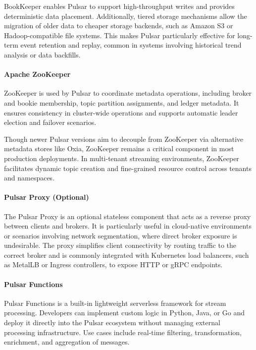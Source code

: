 BookKeeper enables Pulsar to support high-throughput writes and provides deterministic data placement. Additionally, tiered storage mechanisms allow the migration of older data to cheaper storage backends, such as Amazon S3 or Hadoop-compatible file systems. This makes Pulsar particularly effective for long-term event retention and replay, common in systems involving historical trend analysis or data backfills.

\paragraph{Apache ZooKeeper}
ZooKeeper \cite{zookeeper-docs} is used by Pulsar to coordinate metadata operations, including broker and bookie membership, topic partition assignments, and ledger metadata. It ensures consistency in cluster-wide operations and supports automatic leader election and failover scenarios.

Though newer Pulsar versions aim to decouple from ZooKeeper via alternative metadata stores like Oxia, ZooKeeper remains a critical component in most production deployments. In multi-tenant streaming environments, ZooKeeper facilitates dynamic topic creation and fine-grained resource control across tenants and namespaces.

\paragraph{Pulsar Proxy (Optional)}
The Pulsar Proxy is an optional stateless component that acts as a reverse proxy between clients and brokers. It is particularly useful in cloud-native environments or scenarios involving network segmentation, where direct broker exposure is undesirable. The proxy simplifies client connectivity by routing traffic to the correct broker and is commonly integrated with Kubernetes load balancers, such as MetalLB or Ingress controllers, to expose HTTP or gRPC endpoints.

\paragraph{Pulsar Functions}
Pulsar Functions is a built-in lightweight serverless framework for stream processing. Developers can implement custom logic in Python, Java, or Go and deploy it directly into the Pulsar ecosystem without managing external processing infrastructure. Use cases include real-time filtering, transformation, enrichment, and aggregation of messages.

